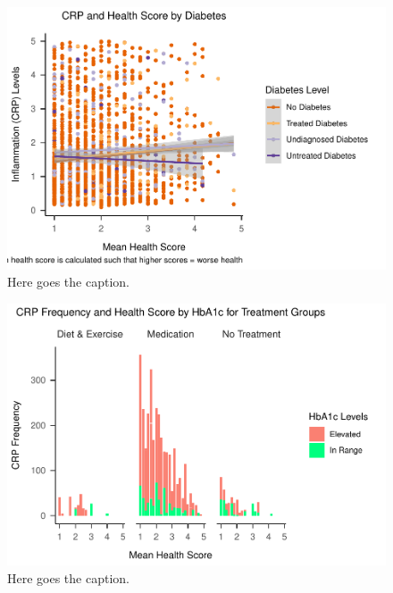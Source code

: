 \documentclass[
  man]{apa6}
\begin{document}
\begin{figure}
\centering
\includegraphics{NEW_Final_Groupof5_files/figure-latex/appendix-fig2-1.pdf}
\caption{\label{fig:appendix-fig2}Here goes the caption.}
\end{figure}



\begin{figure}
\centering
\includegraphics{NEW_Final_Groupof5_files/figure-latex/appendix-fig3-1.pdf}
\caption{\label{fig:appendix-fig3}Here goes the caption.}
\end{figure}
\end{document}
